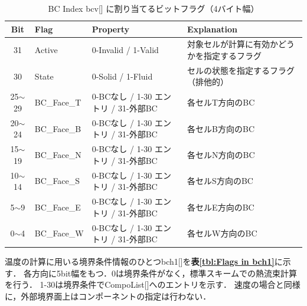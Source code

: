 \begin{table}[htdp]
\caption{BC Index bcv[] に割り当てるビットフラグ（4バイト幅）}
\begin{center}
\small
\begin{tabular}{clll} \toprule
Bit & Flag & Property & Explanation\\ \midrule
31 & Active & 0-Invalid / 1-Valid & 対象セルが計算に有効かどうかを指定するフラグ\\
30 & State  & 0-Solid / 1-Fluid & セルの状態を指定するフラグ（排他的）\\
25$\sim$29 & BC\_Face\_T & 0-BCなし / 1-30 エントリ / 31-外部BC & 各セルT方向のBC\\
20$\sim$24 & BC\_Face\_B & 0-BCなし / 1-30 エントリ / 31-外部BC & 各セルB方向のBC\\
15$\sim$19 & BC\_Face\_N & 0-BCなし / 1-30 エントリ / 31-外部BC & 各セルN方向のBC\\
10$\sim$14 & BC\_Face\_S & 0-BCなし / 1-30 エントリ / 31-外部BC & 各セルS方向のBC\\
5$\sim$9 & BC\_Face\_E & 0-BCなし / 1-30 エントリ / 31-外部BC & 各セルE方向のBC\\
0$\sim$4 & BC\_Face\_W & 0-BCなし / 1-30 エントリ / 31-外部BC & 各セルW方向のBC\\ \bottomrule
\end{tabular}
\end{center}
\label{tbl:Flags in bcv}
\end{table}


温度の計算に用いる境界条件情報のひとつbch1[]を\textbf{表\ref{tbl:Flags in bch1}}に示す．
各方向に5bit幅をもつ．0は境界条件がなく，標準スキームでの熱流束計算を行う．
1-30は境界条件でCompoList[]へのエントリを示す．
速度の場合と同様に，外部境界面上はコンポーネントの指定は行わない．

